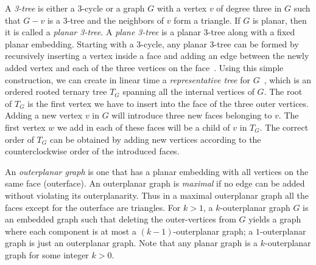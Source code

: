 \documentclass{llncs}
\begin{document}
A \textit{3-tree} is either a 3-cycle or a graph $G$ with a vertex $v$ of degree three in $G$
 such that $G-v$ is a 3-tree and the neighbors of $v$ form a triangle. If $G$ is planar, then
 it is called a \textit{planar 3-tree}. A \textit{plane 3-tree} is a planar 3-tree along with a fixed
 planar embedding. Starting with a 3-cycle, any planar 3-tree can be
 formed by recursively inserting a vertex inside a face and adding an edge between the newly
 added vertex and each of the three vertices on the face~\cite{BE09,MNRA10}.
 Using this simple construction, we can create in linear time a {\em representative tree} for
 $G$~\cite{MNRA10}, which is an ordered rooted ternary tree $T_G$ spanning all the internal
 vertices of $G$. The root of $T_G$ is the first vertex we have to insert into the face of the three
 outer vertices. Adding a new vertex $v$ in $G$ will introduce three new faces belonging to
 $v$. The first vertex $w$ we add in each of these faces will be a child of $v$ in $T_G$. The
 correct order of $T_G$ can be obtained by adding new vertices according to the
 counterclockwise order of the introduced faces. 




An \textit{outerplanar graph} is one that has a planar embedding with all vertices
 on the same face (outerface). An outerplanar graph is \textit{maximal} if no edge can be added without violating its outerplanarity. Thus in a maximal outerplanar graph
 all the faces except for the outerface are triangles.
For $k>1$, a $k$-outerplanar
 graph $G$ is an embedded graph such that deleting the outer-vertices from $G$ yields a graph
 where each component is at most a $(k-1)$-outerplanar graph; a $1$-outerplanar graph is just an outerplanar graph.  Note that any planar graph is a
 $k$-outerplanar graph for some integer $k>0$. 
\end{document}

